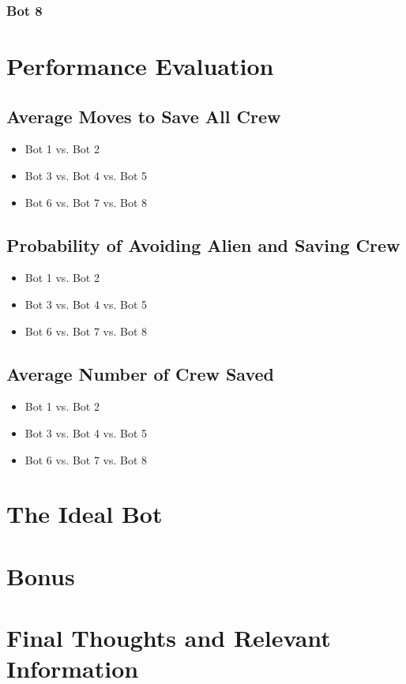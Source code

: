 \documentclass[11pt]{article}
\begin{document}
\subsubsection{Bot 8}



\section{Performance Evaluation}

\subsection{Average Moves to Save All Crew}

\begin{itemize}
    \item Bot 1 vs. Bot 2
    \item Bot 3 vs. Bot 4 vs. Bot 5
    \item Bot 6 vs. Bot 7 vs. Bot 8
\end{itemize}

\subsection{Probability of Avoiding Alien and Saving Crew}

\begin{itemize}
    \item Bot 1 vs. Bot 2
    \item Bot 3 vs. Bot 4 vs. Bot 5
    \item Bot 6 vs. Bot 7 vs. Bot 8
\end{itemize}

\subsection{Average Number of Crew Saved}

\begin{itemize}
    \item Bot 1 vs. Bot 2
    \item Bot 3 vs. Bot 4 vs. Bot 5
    \item Bot 6 vs. Bot 7 vs. Bot 8
\end{itemize}


\section{The Ideal Bot}



\section{Bonus}



\section{Final Thoughts and Relevant Information}
\end{document}
